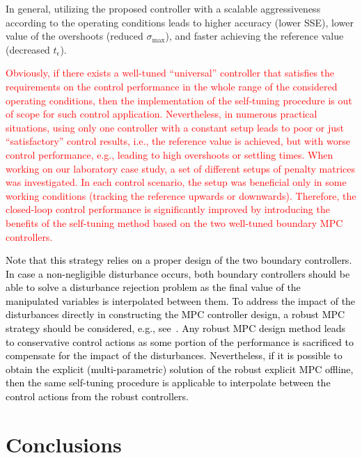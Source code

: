 \documentclass[preprint,12pt]{elsarticle}
\newcommand{\change}[1]{\textcolor{black}{#1}}
\begin{document}
	In general, utilizing the proposed controller with a scalable aggressiveness according to the operating conditions leads to higher accuracy (lower SSE), lower value of the overshoots (reduced $\sigma_{\mathrm{max}}$), and faster achieving the reference value (decreased $t_{\epsilon}$).

	\textcolor{red}{Obviously, if there exists a well-tuned ``universal'' controller that satisfies the requirements on the control performance in the whole range of the considered operating conditions, then the implementation of the self-tuning procedure is out of scope for such control application. Nevertheless, in numerous practical situations, using only one controller with a constant setup leads to poor or just ``satisfactory'' control results, i.e., the reference value is achieved, but with worse control performance, e.g., leading to high overshoots or settling times. When working on our laboratory case study, a set of different setups of penalty matrices was investigated. In each control scenario, the setup was beneficial only in some working conditions (tracking the reference upwards or downwards). Therefore, the closed-loop control performance is significantly improved by introducing the benefits of the self-tuning method based on the two well-tuned boundary MPC controllers.}

	\change{Note that this strategy relies on a proper design of the two boundary controllers.
	In case a non-negligible disturbance occurs, both boundary controllers
	should be able to solve a disturbance rejection problem as the final
	value of the manipulated variables is interpolated between them. To address the impact of the disturbances directly in constructing the MPC controller design, a robust MPC strategy should be considered, e.g., see~\cite{PR11}. Any robust MPC design method leads to conservative control actions as some portion of the performance is sacrificed to compensate for the impact of the disturbances. Nevertheless, if it is possible to obtain the explicit (multi-parametric) solution of the robust explicit MPC offline, then the same self-tuning procedure is applicable to interpolate between the control actions from the robust controllers.} 
	
	\section{Conclusions}
	\label{sec:conclusion}
	
\end{document}

